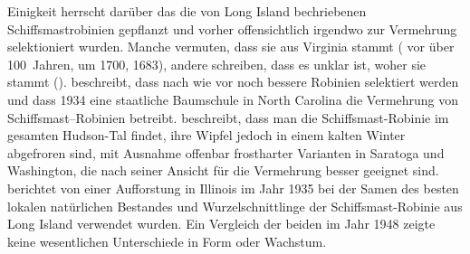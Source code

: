 \documentclass[twocolumn]{scrartcl}
\begin{document}
Einigkeit herrscht darüber das die von Long Island
bechriebenen Schiffsmastrobinien gepflanzt und vorher offensichtlich
irgendwo zur Vermehrung selektioniert wurden. Manche vermuten, dass sie
aus Virginia stammt (\citet{hicks1883robinie} vor über 100~Jahren,
\citet{raber1936shipmast} um 1700, \citet{detwiler1937robinie} 1683),
andere schreiben, dass es unklar ist, woher sie stammt
(\citet{raber1938robinie}). \citet{detwiler1937robinie} beschreibt,
dass nach wie vor noch bessere Robinien selektiert werden und dass
1934 eine staatliche Baumschule in North Carolina die Vermehrung von
Schiffsmast--Robinien betreibt.
\citet{cope1938robinie} beschreibt, dass man die Schiffsmast-Robinie im
gesamten Hudson-Tal findet, ihre Wipfel jedoch in einem kalten Winter
abgefroren sind, mit Ausnahme offenbar frostharter Varianten in
Saratoga und Washington, die nach seiner Ansicht für die Vermehrung
besser geeignet sind.
\citet{minckler1948robinie} berichtet von einer Aufforstung in Illinois
im Jahr 1935 bei der Samen des besten lokalen natürlichen Bestandes
und Wurzelschnittlinge der Schiffsmast-Robinie aus Long Island
verwendet wurden. Ein Vergleich der beiden im Jahr 1948 zeigte keine
wesentlichen Unterschiede in Form oder Wachstum.
\end{document}
